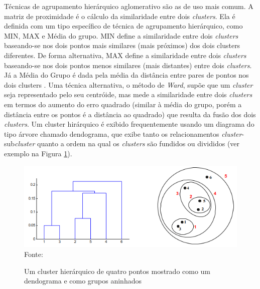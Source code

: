\begin{itemize}
    Técnicas de agrupamento hierárquico aglomerativo são as de uso mais comum. A matriz de proximidade é o cálculo da similaridade entre dois \textit{clusters}. Ela é definida com um tipo específico de técnica de agrupamento hierárquico, como MIN, MAX e Média do grupo. MIN define a similaridade entre dois \textit{clusters} baseando-se nos dois pontos mais similares (mais próximos) dos dois clusters diferentes. De forma alternativa, MAX define a similaridade entre dois \textit{clusters} baseando-se nos dois pontos menos similares (mais distantes) entre dois \textit{clusters}. %
    Já a Média do Grupo é dada pela média da distância entre pares de pontos nos dois clusters \cite{pang2009}. Uma técnica alternativa, o método de \textit{Ward}, supõe que um \textit{cluster} seja representado pelo seu centróide, mas mede a similaridade entre dois \textit{clusters} em termos do aumento do erro quadrado (similar à média do grupo, porém a distância entre os pontos é a distância ao quadrado) que resulta da fusão dos dois \textit{clusters}. Um cluster hirárquico é exibido frequentemente usando um diagrama do tipo árvore chamado dendograma, que exibe tanto os relacionamentos \textit{cluster}-sub\textit{cluster} quanto a ordem na qual os \textit{clusters} são fundidos ou divididos \cite{pang2009} (ver exemplo na Figura \ref{fig:dendograma}).
    
    \begin{figure}[!htb]
       \centering
       \caption{Um cluster hierárquico de quatro pontos mostrado como um dendograma e como grupos aninhados}\label{fig:dendograma} 
       \includegraphics[scale=0.80]{figuras/dendograma.png}
       \\Fonte: \cite{vania2018-2}
    \end{figure}
    

\end{itemize}
